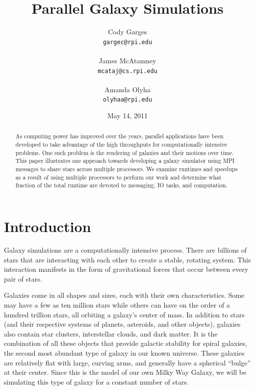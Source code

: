 \documentclass{article}
\begin{document}
\title{Parallel Galaxy Simulations}

\author{Cody Garges \\ \texttt{gargec@rpi.edu} \\ \\
	James McAtamney \\ \texttt{mcataj@cs.rpi.edu} \\ \\
	Amanda Olyha \\ \texttt{olyhaa@rpi.edu} }  
\date{May 14, 2011}	
 
\maketitle


\begin{abstract}

As computing power has improved over the years, parallel applications have been developed to take advantage of the high throughputs for computationally intensive problems.  One such problem is the rendering of galaxies and their motions over time.  This paper illustrates one approach towards developing a galaxy simulator using MPI messages to share stars across multiple processors.  We examine runtimes and speedups as a result of using multiple processors to perform our work and determine what fraction of the total runtime are devoted to messaging, IO tasks, and computation.

\end{abstract}

\section{Introduction}

Galaxy simulations are a computationally intensive process.  There are billions of stars that are interacting with each other to create a stable, rotating system.  This interaction manifests in the form of gravitational forces that occur between every pair of stars. 

Galaxies come in all shapes and sizes, each with their own characteristics.  Some may have a few as ten million stars while others can have on the order of a hundred trillion stars, all orbiting a galaxy's center of mass.  In addition to stars (and their respective systems of planets, asteroids, and other objects), galaxies also contain star clusters, interstellar clouds, and dark matter.  It is the combination of all these objects that provide galactic stability for spiral galaxies, the second most abundant type of galaxy in our known universe.  These galaxies are relatively flat with large, curving arms, and generally have a spherical ``bulge'' at their center.   Since this is the model of our own Milky Way Galaxy, we will be simulating this type of galaxy for a constant number of stars.
\end{document}

